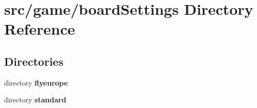 \section{src/game/board\-Settings Directory Reference}
\label{dir_2af89fabecde52216b93cc217088679e}
\subsection*{Directories}
\begin{DoxyCompactItemize}
\item 
directory {\bf flyeurope}
\item 
directory {\bf standard}
\end{DoxyCompactItemize}
